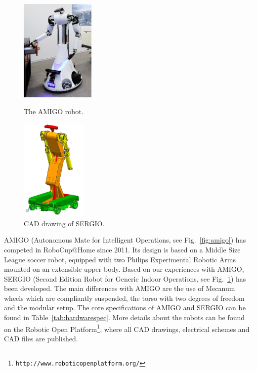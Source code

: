 \begin{figure}[ht]
    \begin{minipage}[t]{0.48\textwidth}
        \centering
        \includegraphics[height = 5.0cm]{Figures/amigo.jpg}
        \caption{The AMIGO robot.}
        \label{fig:amigo}
    \end{minipage}
    \hfill
    \begin{minipage}[t]{0.48\textwidth}
        \centering
        \includegraphics[height = 5.0cm]{Figures/sergio.png}
        \caption{CAD drawing of SERGIO.}
        \label{fig:sergio}
    \end{minipage}
\end{figure}
AMIGO (Autonomous Mate for Intelligent Operations, see Fig.~\ref{fig:amigo}) has competed in RoboCup@Home since 2011. Its design is based on a Middle Size League soccer robot, equipped with two Philips Experimental Robotic Arms mounted on an extensible upper body. Based on our experiences with AMIGO, SERGIO (Second Edition Robot for Generic Indoor Operations, see Fig.~\ref{fig:sergio}) has been developed. The main differences with AMIGO are the use of Mecanum wheels which are compliantly suspended, the torso with two degrees of freedom and the modular setup. The core specifications of AMIGO and SERGIO can be found in Table~\ref{tab:hardwarespec}. More details about the robots can be found on the Robotic Open Platform\footnote{\texttt{http://www.roboticopenplatform.org/}}, where all CAD drawings, electrical schemes and CAD files are published. 

